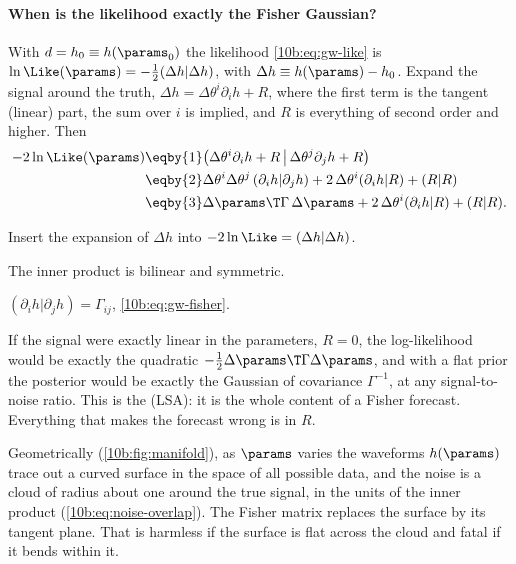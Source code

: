 \paragraph{When is the likelihood exactly the Fisher Gaussian?} With $d=h_0\equiv h(\params_0)$ the likelihood
\eqref{10b:eq:gw-like} is $\ln\Like(\params)=-\tfrac12(\Delta h|\Delta h)$, with $\Delta h\equiv h(\params)-h_0$. Expand the
signal around the truth, $\Delta h=\Delta\theta^i\partial_ih+R$, where the first term is the tangent (linear) part, the sum
over $i$ is implied, and $R$ is everything of second order and higher. Then
\begin{align}
  -2\ln\Like(\params)
  &\eqby{1}\big(\Delta\theta^i\partial_ih+R\,\big|\,\Delta\theta^j\partial_jh+R\big)\nonumber\\
  &\eqby{2}\Delta\theta^i\Delta\theta^j\,(\partial_ih|\partial_jh)+2\,\Delta\theta^i(\partial_ih|R)+(R|R)\nonumber\\
  &\eqby{3}\Delta\params\T\Gamma\,\Delta\params+2\,\Delta\theta^i(\partial_ih|R)+(R|R).
  \label{10b:eq:lsa}
\end{align}
\begin{explain}
  \item Insert the expansion of $\Delta h$ into $-2\ln\Like=(\Delta h|\Delta h)$.
  \item The inner product is bilinear and symmetric.
  \item $(\partial_ih|\partial_jh)=\Gamma_{ij}$, \eqref{10b:eq:gw-fisher}.
\end{explain}
If the signal were exactly linear in the parameters, $R=0$, the log-likelihood would be exactly the quadratic
$-\tfrac12\Delta\params\T\Gamma\Delta\params$, and with a flat prior the posterior would be exactly the Gaussian of covariance
$\Gamma^{-1}$, at any signal-to-noise ratio. This is the  (LSA): it is the whole
content of a Fisher forecast. Everything that makes the forecast wrong is in $R$.

Geometrically (\cref{10b:fig:manifold}), as $\params$ varies the waveforms $h(\params)$ trace out a curved surface in the
space of all possible data, and the noise is a cloud of radius about one around the true signal, in the units of the
inner product (\cref{10b:eq:noise-overlap}). The Fisher matrix replaces the surface by its tangent plane. That is
harmless if the surface is flat across the cloud and fatal if it bends within it.

